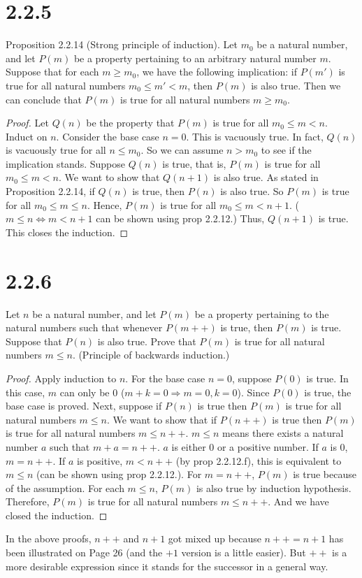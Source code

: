 \documentclass[12pt, letter]{article}
\begin{document}
\section*{2.2.5}
Proposition 2.2.14 (Strong principle of induction). Let $m_0$ be a natural number, and let $P(m)$ be a property pertaining to an arbitrary natural 
number $m$. Suppose that for each $m\geq m_0$, we have the following implication: if $P(m')$ is true for all natural numbers $m_0\leq m'<m$, then $P(m)$ is also true.
Then we can conclude that $P(m)$ is true for all natural numbers $m\geq m_0$.
\begin{proof}
    Let $Q(n)$ be the property that $P(m)$ is true for all $m_0\leq m<n$. Induct on $n$. 
    Consider the base case $n=0$. This is vacuously true. In fact, $Q(n)$ is vacuously true for all $n \leq m_0$. So we can assume $n>m_0$ to see if the implication stands. Suppose $Q(n)$ is true, that is, $P(m)$ is true for all $m_0\leq m<n$. 
    We want to show that $Q(n+1)$ is also true. As stated in Proposition 2.2.14, if $Q(n)$ is true, then $P(n)$ is also true. 
    So $P(m)$ is true for all $m_0\leq m\leq n$. Hence, $P(m)$ is true for all $m_0\leq m<n+1$. ($m\leq n \Leftrightarrow m<n+1$ can be shown using prop 2.2.12.) Thus, $Q(n+1)$ is true. This closes the induction.
\end{proof}
\section*{2.2.6}
Let $n$ be a natural number, and let $P(m)$ be a property pertaining to the natural numbers such that whenever $P(m++)$ is true, then $P(m)$
is true. Suppose that $P(n)$ is also true. Prove that $P(m)$ is true for all natural numbers $m\leq n$. (Principle of backwards induction.)
\begin{proof}
    Apply induction to $n$. For the base case $n=0$, suppose $P(0)$ is true. In this case, $m$ can only be 0 ($m+k=0 \Rightarrow m=0,k=0$). Since $P(0)$ is true, 
    the base case is proved. Next, suppose if $P(n)$ is true then $P(m)$ is true for all natural numbers $m\leq n$. We want to show that if $P(n++)$ is true then $P(m)$ is true for all 
    natural numbers $m\leq n++$. $m\leq n$ means there exists a natural number $a$ such that $m+a=n++$. $a$ is either 0 or a positive number. If $a$ is 0, $m=n++$. If $a$ is positive, $m<n++$ (by prop 2.2.12.f), this is equivalent to $m\leq n$ (can be shown using prop 2.2.12.). 
    For $m=n++$, $P(m)$ is true because of the assumption. For each $m\leq n$, $P(m)$ is also true by induction hypothesis. Therefore, $P(m)$ is true for all natural numbers $m\leq n++$. And we have closed the induction.
\end{proof}
In the above proofs, $n++$ and $n+1$ got mixed up because $n++=n+1$ has been illustrated on Page 26 (and the $+1$ version is a little easier). But $++$ is a more desirable expression since it stands for the successor in a general way. 
\end{document}
